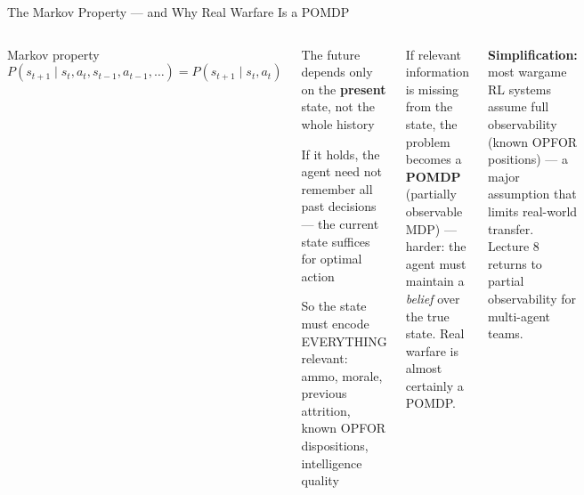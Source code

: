 \documentclass[aspectratio=169,10pt,t]{beamer}
\begin{document}
\begin{frame}{The Markov Property --- and Why Real Warfare Is a POMDP}
\begin{columns}[T]
\begin{fbx}{Markov property}\[P(s_{t+1}\mid s_t,a_t,s_{t-1},a_{t-1},\ldots)=P(s_{t+1}\mid s_t,a_t)\]\end{fbx}
\begin{tl}\item The future depends only on the \textbf{present} state, not the whole history\item If it holds, the agent need not remember all past decisions --- the current state suffices for optimal action\item So the state must encode EVERYTHING relevant: ammo, morale, previous attrition, known OPFOR dispositions, intelligence quality\end{tl}
\begin{wbox}\scriptsize If relevant information is missing from the state, the problem becomes a \textbf{POMDP} (partially observable MDP) --- harder: the agent must maintain a \emph{belief} over the true state. Real warfare is almost certainly a POMDP.\end{wbox}
\begin{ibox}\scriptsize\textbf{Simplification:} most wargame RL systems assume full observability (known OPFOR positions) --- a major assumption that limits real-world transfer. Lecture 8 returns to partial observability for multi-agent teams.\end{ibox}
\end{columns}
\end{frame}
\end{document}
